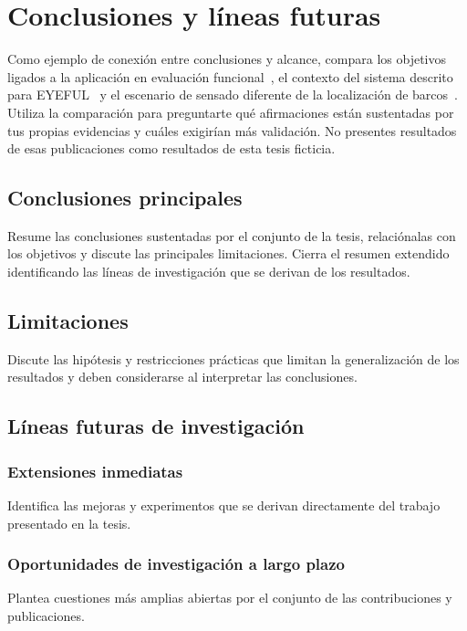 %

\chapter{Conclusiones y líneas futuras}
\label{cha:compendium-conclusions}

Como ejemplo de conexión entre conclusiones y alcance, compara los objetivos ligados a la aplicación en evaluación funcional~\cite{nieva2024proposal}, el contexto del sistema descrito para EYEFUL~\cite{nieva2023eyeful} y el escenario de sensado diferente de la localización de barcos~\cite{ramirez2026jstars}. Utiliza la comparación para preguntarte qué afirmaciones están sustentadas por tus propias evidencias y cuáles exigirían más validación. No presentes resultados de esas publicaciones como resultados de esta tesis ficticia.

\section{Conclusiones principales}

Resume las conclusiones sustentadas por el conjunto de la tesis, relaciónalas con los objetivos y discute las principales limitaciones. Cierra el resumen extendido identificando las líneas de investigación que se derivan de los resultados.

\section{Limitaciones}

Discute las hipótesis y restricciones prácticas que limitan la generalización de los resultados y deben considerarse al interpretar las conclusiones.

\section{Líneas futuras de investigación}
\subsection{Extensiones inmediatas}

Identifica las mejoras y experimentos que se derivan directamente del trabajo presentado en la tesis.

\subsection{Oportunidades de investigación a largo plazo}

Plantea cuestiones más amplias abiertas por el conjunto de las contribuciones y publicaciones.

